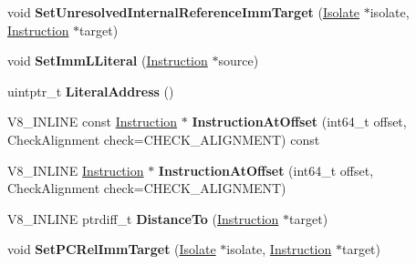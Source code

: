 \begin{DoxyCompactItemize}
\item 
void {\bfseries Set\+Unresolved\+Internal\+Reference\+Imm\+Target} (\hyperlink{classv8_1_1internal_1_1_isolate}{Isolate} $\ast$isolate, \hyperlink{classv8_1_1internal_1_1_instruction}{Instruction} $\ast$target)\hypertarget{classv8_1_1internal_1_1_instruction_a5329d89652327a500ab51d8b43970abe}{}\label{classv8_1_1internal_1_1_instruction_a5329d89652327a500ab51d8b43970abe}

\item 
void {\bfseries Set\+Imm\+L\+Literal} (\hyperlink{classv8_1_1internal_1_1_instruction}{Instruction} $\ast$source)\hypertarget{classv8_1_1internal_1_1_instruction_ac6a3f98c64d4bc69f2d5a7ecccbddb59}{}\label{classv8_1_1internal_1_1_instruction_ac6a3f98c64d4bc69f2d5a7ecccbddb59}

\item 
uintptr\+\_\+t {\bfseries Literal\+Address} ()\hypertarget{classv8_1_1internal_1_1_instruction_a9597e888188d3c20e82d6b00b93dbc0d}{}\label{classv8_1_1internal_1_1_instruction_a9597e888188d3c20e82d6b00b93dbc0d}

\item 
V8\+\_\+\+I\+N\+L\+I\+NE const \hyperlink{classv8_1_1internal_1_1_instruction}{Instruction} $\ast$ {\bfseries Instruction\+At\+Offset} (int64\+\_\+t offset, Check\+Alignment check=C\+H\+E\+C\+K\+\_\+\+A\+L\+I\+G\+N\+M\+E\+NT) const \hypertarget{classv8_1_1internal_1_1_instruction_a61218ccf6cc094d6a8e54e7775520edd}{}\label{classv8_1_1internal_1_1_instruction_a61218ccf6cc094d6a8e54e7775520edd}

\item 
V8\+\_\+\+I\+N\+L\+I\+NE \hyperlink{classv8_1_1internal_1_1_instruction}{Instruction} $\ast$ {\bfseries Instruction\+At\+Offset} (int64\+\_\+t offset, Check\+Alignment check=C\+H\+E\+C\+K\+\_\+\+A\+L\+I\+G\+N\+M\+E\+NT)\hypertarget{classv8_1_1internal_1_1_instruction_ac4b2539339c911a2aea99746f161f9e5}{}\label{classv8_1_1internal_1_1_instruction_ac4b2539339c911a2aea99746f161f9e5}

\item 
V8\+\_\+\+I\+N\+L\+I\+NE ptrdiff\+\_\+t {\bfseries Distance\+To} (\hyperlink{classv8_1_1internal_1_1_instruction}{Instruction} $\ast$target)\hypertarget{classv8_1_1internal_1_1_instruction_ae5f8a7f859452caae4d852c29ce59e3a}{}\label{classv8_1_1internal_1_1_instruction_ae5f8a7f859452caae4d852c29ce59e3a}

\item 
void {\bfseries Set\+P\+C\+Rel\+Imm\+Target} (\hyperlink{classv8_1_1internal_1_1_isolate}{Isolate} $\ast$isolate, \hyperlink{classv8_1_1internal_1_1_instruction}{Instruction} $\ast$target)\hypertarget{classv8_1_1internal_1_1_instruction_a9b7e832fb0bf345a322c1687d0817600}{}\label{classv8_1_1internal_1_1_instruction_a9b7e832fb0bf345a322c1687d0817600}


\end{DoxyCompactItemize}
